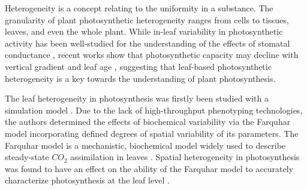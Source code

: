 \documentclass{bioinfo}
\begin{document}
Heterogeneity is a concept relating to the uniformity in a substance. The granularity of plant photosynthetic heterogeneity ranges from cells to tissues, leaves, and even the whole plant. While in-leaf variability in photosynthetic activity has been well-studied for the understanding of the effects of stomatal conductance \citep{Buckley1997,Cheeseman1991}, recent works show that photosynthetic capacity may decline with vertical gradient and leaf age \citep{chen2008effect,Kitajima2002}, suggesting that leaf-based photosynthetic heterogeneity is a key towards the understanding of plant photosynthesis.

The leaf heterogeneity in photosynthesis was firstly been studied  with a simulation model \citep{chen2008effect}. Due to the lack of high-throughput phenotyping technologies, the authors determined the effects of biochemical variability via the Farquhar model incorporating defined degrees of spatial variability of its parameters. The Farquhar model is a mechanistic, biochemical model widely used to describe steady-state $CO_2$ assimilation in leaves \citep{farquhar2001models,sharkey1985o2}. Spatial heterogeneity in photosynthesis was found to have an effect on the ability of the Farquhar model to accurately characterize photosynthesis at the leaf level \citep{chen2008effect}.
\end{document}
